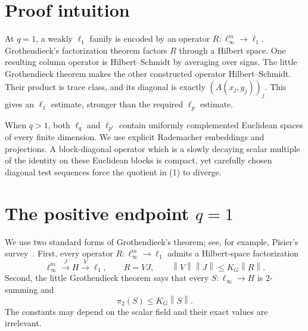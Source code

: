 \documentclass[11pt]{article}
\newcommand{\norm}[1]{\left\lVert #1\right\rVert}
\begin{document}
\section{Proof intuition}

At $q=1$, a weakly $\ell_1$ family is encoded by an operator
$R:\ell_\infty^m\to\ell_1$.  Grothendieck's factorization theorem factors
$R$ through a Hilbert space.  One resulting column operator is
Hilbert--Schmidt by averaging over signs.  The little Grothendieck theorem
makes the other constructed operator Hilbert--Schmidt.  Their product is
trace class, and its diagonal is exactly $(A(x_j,y_j))_j$.  This gives an
$\ell_1$ estimate, stronger than the required $\ell_p$ estimate.

When $q>1$, both $\ell_q$ and $\ell_{p'}$ contain uniformly complemented
Euclidean spaces of every finite dimension.  We use explicit Rademacher
embeddings and projections.  A block-diagonal operator which is a slowly
decaying scalar multiple of the identity on these Euclidean blocks is
compact, yet carefully chosen diagonal test sequences force the quotient in
(1) to diverge.

\section{The positive endpoint \texorpdfstring{$q=1$}{q=1}}

We use two standard forms of Grothendieck's theorem; see, for example,
Pisier's survey~\cite{Pisier}.  First, every operator
$R:\ell_\infty^m\to\ell_1$ admits a Hilbert-space factorization
\[
 \ell_\infty^m\xrightarrow{J}H\xrightarrow{V}\ell_1,
 \qquad R=VJ,\qquad \norm V\norm J\le K_G\norm R.                       \tag{3}
\]
Second, the little Grothendieck theorem says that every
$S:\ell_\infty\to H$ is $2$-summing and
\[
 \pi_2(S)\le K_G\norm S.                                               \tag{4}
\]
The constants may depend on the scalar field and their exact values are
irrelevant.
\end{document}
